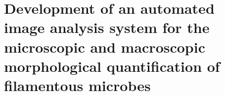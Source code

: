 \documentclass[a4paper,12pt]{report}
\begin{document}
\setcounter{chapter}{2}

\chapter{Development of an automated image analysis system for the microscopic and macroscopic morphological quantification of filamentous microbes}











\newpage
{}
{}



\end{document}
